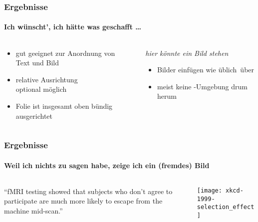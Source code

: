 \documentclass[utf8]{beamer}
\begin{document}
\begin{frame}[t]
\frametitle{Ergebnisse}
\framesubtitle{Ich wünscht', ich hätte was geschafft \ldots}

\begin{columns}[T]
\begin{column}{.45\textwidth}

\begin{itemize}
\item gut geeignet zur Anordnung von\\ Text und Bild
\item relative Ausrichtung\\ optional möglich
\item Folie ist insgesamt oben bündig ausgerichtet
\end{itemize}

\end{column}
%
\begin{column}{.45\textwidth}

\vspace*{1ex}

\emph{hier könnte ein Bild stehen}

\begin{itemize}
\item Bilder einfügen wie üblich über 
\item meist keine -Umgebung drum herum
\end{itemize}

\end{column}
\end{columns}

\end{frame}


\begin{frame}[t]
\frametitle{Ergebnisse}
\framesubtitle{Weil ich nichts zu sagen habe, zeige ich ein (fremdes) Bild}

\begin{columns}[T]
\begin{column}{.5\textwidth}


\enquote{fMRI testing showed that subjects who don't agree to participate are much more likely to escape from the machine mid-scan.}

\end{column}
%
\begin{column}{.4\textwidth}

\texttt{[image: xkcd-1999-selection\_effect]}

\end{column}
\end{columns}

\end{frame}
\end{document}
